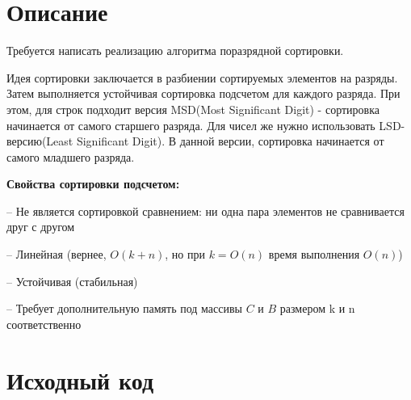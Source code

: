 \section{Описание}

Требуется написать реализацию алгоритма поразрядной сортировки.

Идея сортировки заключается в разбиении сортируемых элементов на разряды. Затем выполняется устойчивая сортировка подсчетом для каждого разряда. При этом, для строк подходит версия MSD(Most Significant Digit) - сортировка начинается от самого старшего разряда. Для чисел же нужно использовать LSD-версию(Least Significant Digit). В данной версии, сортировка начинается от самого младшего разряда.

{\bf Свойства сортировки подсчетом:}

	-- Не является сортировкой сравнением: ни одна пара
элементов не сравнивается друг с другом

	-- Линейная (вернее, $O(k + n)$, но при $k = O(n)$ время
выполнения $O(n)$)

	-- Устойчивая (стабильная)
	
	-- Требует дополнительную память под массивы $C$ и $B$
размером k и n соответственно
\pagebreak

\section{Исходный код}

